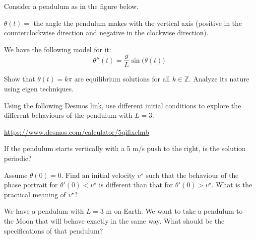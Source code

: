 \documentclass{workbook}
\begin{document}
\begin{slide}

\question

Consider a pendulum as in the figure below.

\begin{multicols}{2}
\begin{center}
\end{center}

\columnbreak
$\theta(t) = $ the angle the pendulum makes with the vertical axis (positive in the counterclockwise direction and negative in the clockwise direction).
\end{multicols}
We have the following model for it:
\[
\theta''(t) = \frac{g}{L} \sin\big( \theta(t) \big)
\]


\begin{parts}
	\item Show that $\theta(t)=k\pi$ are equilibrium solutions for all $k\in \mathbb{Z}$. Analyze its nature using eigen techniques.

\bigskip

	\item Using the following Desmos link, use different initial conditions to explore the different behaviours of the pendulum with $L=3$.

		{\small \url{https://www.desmos.com/calculator/5qifixelmb}}
		
	\item If the pendulum starts vertically with a 5 m/s push to the right, is the solution periodic?
	
	\item Assume $\theta(0)=0$. Find an initial velocity $v^\star$ such that the behaviour of the phase portrait for $\theta'(0)<v^\star$ is different than that for $\theta'(0)>v^\star$. What is the practical meaning of $v^\star$?
	
	\item We have a pendulum with $L=3$ m on Earth. We want to take a pendulum to the Moon that will behave exactly in the same way. What should be the specifications of that pendulum?

\end{parts}


\end{slide}
\end{document}
